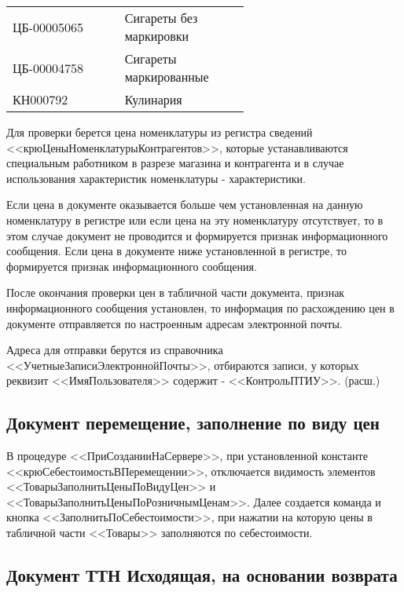 \vspace{\baselineskip}
\begin{tabular}{p{0.3\linewidth}p{0.3\linewidth}}

	\toprule
	ЦБ-00005065 & Сигареты без маркировки \\
	ЦБ-00004758 & Сигареты маркированные \\

	КН000792 & Кулинария \\
	\bottomrule %
\end{tabular}
\vspace{\baselineskip}\par
Для проверки берется цена номенклатуры из регистра сведений <<крюЦеныНоменклатурыКонтрагентов>>,
которые устанавливаются специальным работником в разрезе магазина и контрагента и в случае использования характеристик номенклатуры - характеристики.\par
Если цена в документе оказывается больше чем установленная на данную номенклатуру в регистре или если цена на эту номенклатуру отсутствует, то в этом случае документ не проводится и формируется признак информационного сообщения. Если цена в документе ниже установленной в регистре, то формируется признак информационного сообщения.\par
После окончания проверки цен в табличной части документа, признак информационного  сообщения установлен, то информация по расхождению цен в документе отправляется по настроенным адресам электронной почты.\par
Адреса для отправки берутся из справочника <<УчетныеЗаписиЭлектроннойПочты>>, отбираются записи, у которых реквизит  <<ИмяПользователя>> содержит - <<КонтрольПТИУ>>.
(расш.)


\subsection{Документ перемещение, заполнение по виду цен}\label{1007}

В процедуре <<ПриСозданииНаСервере>>, при установленной константе <<крюСебестоимостьВПеремещении>>, отключается видимость элементов <<ТоварыЗаполнитьЦеныПоВидуЦен>> и <<ТоварыЗаполнитьЦеныПоРозничнымЦенам>>.
Далее создается команда и кнопка <<ЗаполнитьПоСебестоимости>>, при нажатии на которую цены в табличной части <<Товары>> заполняются по себестоимости.


\subsection{Документ ТТН Исходящая, на основании возврата}\label{1008}

